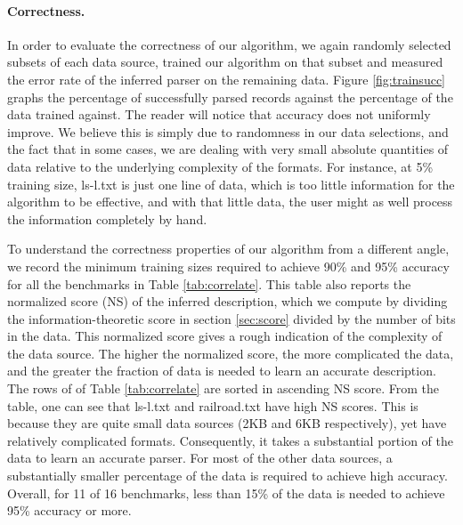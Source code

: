 \paragraph*{Correctness.}
In order to evaluate the correctness of our algorithm, we again randomly selected
subsets of each data source, trained our algorithm on that subset and
measured the error rate of the inferred parser on the remaining data.
Figure \ref{fig:trainsucc} graphs the percentage of successfully parsed records
against the percentage of the data trained against.  The reader will notice
that accuracy does not uniformly improve.  We believe this is simply due to
randomness in our data selections, and the fact that in some cases,
we are dealing with very small absolute quantities of data relative 
to the underlying complexity of the formats.  
For instance, at 5\% training size, ls-l.txt is just one line of data, which is
too little information for the algorithm to be effective, and with that little
data, the user might as well process the information completely by hand.

To understand the correctness properties of our algorithm from a different angle,
we record the minimum training sizes required to achieve 90\% and 95\% accuracy for
all the benchmarks in Table \ref{tab:correlate}.  This table also reports the
normalized score (NS) of the inferred description, which we compute by dividing the
information-theoretic score in section \ref{sec:score} 
divided by the number of bits in the data.  This normalized score gives
a rough indication of the complexity of the data source.  The higher the
normalized score, the more complicated the data, and the greater the fraction of data is
needed to learn an accurate description.  The rows of of Table \ref{tab:correlate}
are sorted in ascending NS score.  From the table, one can see that ls-l.txt and
railroad.txt have high NS scores.  This is because they are quite small data sources
(2KB and 6KB respectively), yet have relatively complicated formats.  Consequently,
it takes a substantial portion of the data to learn an accurate parser.  For most of the other
data sources, a substantially smaller percentage of the data is required to achieve
high accuracy.  Overall, for 11 of 16 benchmarks, less than
15\% of the data is needed to achieve 95\% accuracy or more.

